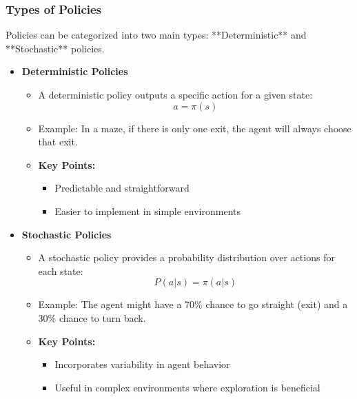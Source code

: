 \documentclass{beamer}
\begin{document}
\begin{frame}[fragile]
    \frametitle{Types of Policies}
    Policies can be categorized into two main types: **Deterministic** and **Stochastic** policies.
    \begin{itemize}
        \item \textbf{Deterministic Policies}
        \begin{itemize}
            \item A deterministic policy outputs a specific action for a given state:
            \[
            a = \pi(s)
            \]
            \item Example: In a maze, if there is only one exit, the agent will always choose that exit.
            \item \textbf{Key Points:}
            \begin{itemize}
                \item Predictable and straightforward
                \item Easier to implement in simple environments
            \end{itemize}
        \end{itemize}
        
        \item \textbf{Stochastic Policies}
        \begin{itemize}
            \item A stochastic policy provides a probability distribution over actions for each state:
            \[
            P(a | s) = \pi(a | s)
            \]
            \item Example: The agent might have a 70\% chance to go straight (exit) and a 30\% chance to turn back.
            \item \textbf{Key Points:}
            \begin{itemize}
                \item Incorporates variability in agent behavior
                \item Useful in complex environments where exploration is beneficial
            \end{itemize}
        \end{itemize}
    \end{itemize}
\end{frame}
\end{document}
